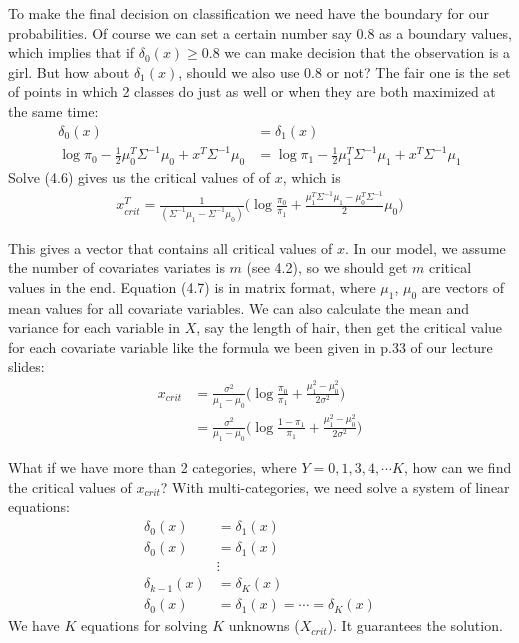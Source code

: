 \documentclass[12pt]{article}
\theoremstyle{definition}
\numberwithin{equation}{section}
\numberwithin{figure}{section}
\numberwithin{table}{section}
\begin{document}
To make the final decision on classification we need have the boundary for our probabilities. Of course we can set a certain number say $0.8$ as a boundary values, which implies that if $\delta_0(x) \geq 0.8$ we can make decision that the observation is a girl. But how about $\delta_1(x)$, should we also use $0.8$ or not? The fair one is the set of points in which 2 classes do just as well or when they are both maximized at the same time:
\begin{align}
	\delta_0(x) & = \delta_1(x) \\
	\log \pi_0 - \frac{1}{2} \mu_0^T \Sigma^{-1} \mu_0 + x^T \Sigma^{-1} \mu_0 & = \log \pi_1 - \frac{1}{2} \mu_1^T \Sigma^{-1} \mu_1 + x^T \Sigma^{-1} \mu_1
\end{align}
Solve (4.6) gives us the critical values of of $x$, which is
\begin{align}
 x_{crit}^T = \frac{1}{(\Sigma^{-1}\mu_1 - \Sigma^{-1}\mu_0)}\big (\log \frac{\pi_0}{\pi_1} + \frac{ \mu_1^T \Sigma^{-1} \mu_1 -  \mu_0^T \Sigma^{-1}}{2} \mu_0 \big )	
\end{align}

This gives a vector that contains all critical values of $x$. In our model, we assume the number of covariates variates is $m$ (see 4.2), so we should get $m$ critical values in the end. Equation (4.7) is in matrix format, where $\mu_1$, $\mu_0$ are vectors of mean values for all covariate variables. We can also calculate the mean and variance for each variable in $X$, say the length of hair, then get the critical value for each covariate variable like the formula we been given in p.33 of our lecture slides:
\begin{align*}
	x_{crit} & = \frac{\sigma^2}{\mu_1 - \mu_0} \big( \log \frac{\pi_0}{\pi_1} + \frac{\mu_1^2 - \mu_0^2}{2 \sigma^2} \big ) \\
	& = \frac{\sigma^2}{\mu_1 - \mu_0} \big( \log \frac{1-\pi_1}{\pi_1} + \frac{\mu_1^2 - \mu_0^2}{2 \sigma^2} \big )
\end{align*}

What if we have more than 2 categories, where $Y=0, 1, 3, 4, \cdots K$, how can we find the critical values of $x_{crit}$? With multi-categories, we need solve a system of linear equations:
\begin{align*}
	\delta_{0}(x) & = \delta_{1}(x) \\
	\delta_{0}(x) & = \delta_{1}(x)  \\
	& \vdots \\
	\delta_{k-1}(x) & = \delta_{K}(x) \\
	\delta_{0}(x) & = \delta_{1}(x) = \cdots = \delta_{K}(x)
\end{align*}
We have $K$ equations for solving $K$ unknowns ($X_{crit}$). It guarantees the solution. 
\end{document}
